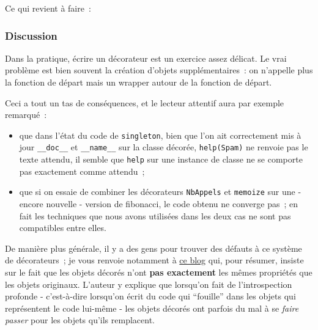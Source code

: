     Ce qui revient à faire~:

\begin{Shaded}
\begin{Highlighting}[frame=lines,framerule=0.6mm,rulecolor=\color{asisframecolor}]
\OperatorTok{=}
\OperatorTok{=}
\end{Highlighting}
\end{Shaded}

    \hypertarget{discussion}{%
\subsubsection{Discussion}\label{discussion}}

    Dans la pratique, écrire un décorateur est un exercice assez délicat. Le
vrai problème est bien souvent la création d'objets supplémentaires~: on
n'appelle plus la fonction de départ mais un wrapper autour de la
fonction de départ.

Ceci a tout un tas de conséquences, et le lecteur attentif aura par
exemple remarqué~:

\begin{itemize}
\tightlist
\item
  que dans l'état du code de \texttt{singleton}, bien que l'on ait
  correctement mis à jour \texttt{\_\_doc\_\_} et \texttt{\_\_name\_\_}
  sur la classe décorée, \texttt{help(Spam)} ne renvoie pas le texte
  attendu, il semble que \texttt{help} sur une instance de classe ne se
  comporte pas exactement comme attendu~;
\item
  que si on essaie de combiner les décorateurs \texttt{NbAppels} et
  \texttt{memoize} sur une - encore nouvelle - version de fibonacci, le
  code obtenu ne converge pas~; en fait les techniques que nous avons
  utilisées dans les deux cas ne sont pas compatibles entre elles.
\end{itemize}

De manière plus générale, il y a des gens pour trouver des défauts à ce
système de décorateurs~; je vous renvoie notamment à
\href{http://blog.dscpl.com.au/2014/01/how-you-implemented-your-python.html}{ce
blog} qui, pour résumer, insiste sur le fait que les objets décorés
n'ont \textbf{pas exactement} les mêmes propriétés que les objets
originaux. L'auteur y explique que lorsqu'on fait de l'introspection
profonde - c'est-à-dire lorsqu'on écrit du code qui ``fouille'' dans les
objets qui représentent le code lui-même - les objets décorés ont
parfois du mal à se \emph{faire passer} pour les objets qu'ils
remplacent.

